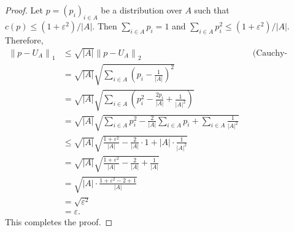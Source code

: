 \documentclass[letterpaper, reqno,11pt]{article}
\begin{document}
\begin{enumerate}
\begin{enumerate}
    \begin{proof}
      Let $p = (p_i)_{i \in A}$ be a distribution over $A$ such that $c(p) \leq (1 + \varepsilon^2)/|A|$. Then $\sum_{i \in A} p_i = 1$ and $\sum_{i \in A} p_i^2 \leq (1 + \varepsilon^2)/|A|$. Therefore,
      \begin{align*}
        \left\| p - U_A \right\|_1 &\leq \sqrt{|A|} \left\| p - U_A \right\|_2 && \text{(Cauchy-Schwarz inequality)} \\
        &= \sqrt{|A|} \sqrt{\sum_{i \in A} \left(p_i - \frac{1}{|A|}\right)^2} \\
        &= \sqrt{|A|} \sqrt{\sum_{i \in A} \left(p_i^2 - \frac{2p_i}{|A|} + \frac{1}{|A|^2}\right)} \\
        &= \sqrt{|A|} \sqrt{\sum_{i \in A} p_i^2 - \frac{2}{|A|}\sum_{i \in A} p_i + \sum_{i \in A} \frac{1}{|A|^2}} \\
        &\leq \sqrt{|A|} \sqrt{\frac{1 + \varepsilon^2}{|A|} - \frac{2}{|A|} \cdot 1 + |A| \cdot \frac{1}{|A|^2}} \\
        &= \sqrt{|A|} \sqrt{\frac{1 + \varepsilon^2}{|A|} - \frac{2}{|A|} + \frac{1}{|A|}} \\
        &= \sqrt{|A| \cdot \frac{1 + \varepsilon^2 - 2 + 1}{|A|}} \\
        &= \sqrt{\varepsilon^2} \\
        &= \varepsilon.
      \end{align*}
      This completes the proof.
    \end{proof}
  \end{enumerate}
\end{enumerate}
\end{document}
